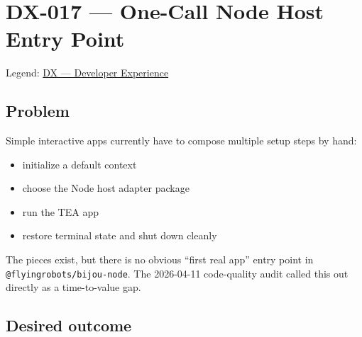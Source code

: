\chapter{DX-017 --- One-Call Node Host Entry Point}\label{record-325}

\smallskip

Legend: \href{https://github.com/flyingrobots/bijou/blob/cbd70612140e7a450d764b3c7be1c6af878b99bc/docs/method/graveyard/legends/DX-developer-experience.md}{DX --- Developer Experience}

\section{Problem}\label{record-325-problem}

Simple interactive apps currently have to compose multiple setup steps by hand:

\begin{itemize}
\tightlist
\item
  initialize a default context
\item
  choose the Node host adapter package
\item
  run the TEA app
\item
  restore terminal state and shut down cleanly
\end{itemize}

The pieces exist, but there is no obvious ``first real app'' entry point in \texttt{@\allowbreak{}f\allowbreak{}l\allowbreak{}y\allowbreak{}i\allowbreak{}n\allowbreak{}g\allowbreak{}r\allowbreak{}o\allowbreak{}b\allowbreak{}o\allowbreak{}t\allowbreak{}s\allowbreak{}/\allowbreak{}b\allowbreak{}i\allowbreak{}j\allowbreak{}o\allowbreak{}u\allowbreak{}-\allowbreak{}n\allowbreak{}o\allowbreak{}d\allowbreak{}e}. The 2026-04-11 code-quality audit called this out directly as a time-to-value gap.

\section{Desired outcome}\label{record-325-desired-outcome}


